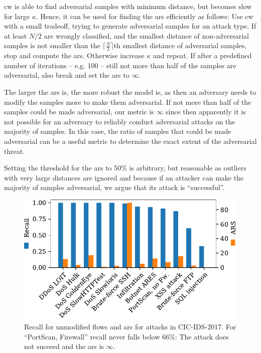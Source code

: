\documentclass[conference]{IEEEtran}
\begin{document}
\gls{cw} is able to find adversarial samples with minimum distance, but becomes slow for large $\kappa$. Hence, it can be used for finding the \gls{ars} efficiently as follows: 
Use \gls{cw} with a small tradeoff, trying to generate adversarial samples for an attack type. If %
 at least $N/2$  are wrongly classified, and
 the smallest distance of non-adversarial samples is not smaller than the $\lceil\frac{N}{2}\rceil$th smallest distance of adversarial samples,
stop and compute the \gls{ars}. Otherwise increase $\kappa$ and repeat. If after a predefined number of iterations -- e.g. 100 -- still not more than half of the samples are adversarial, also break and set the \gls{ars} to $\infty$.

The larger the \gls{ars} is, the more robust the model is, as then an adversary needs to modify the samples more to make them adversarial. If not more than half of the samples could be made adversarial, our metric is $\infty$ since then apparently it is not possible for an adversary to reliably conduct adversarial attacks on the majority of samples. In this case, the ratio of samples that could be made adversarial can be a useful metric to determine the exact extent of the adversarial threat.

Setting the threshold for the \gls{ars} to 50\% is arbitrary, but
 reasonable as outliers with very large distances are ignored and because if an attacker can make the majority of samples adversarial, we argue that its attack is ``successful''.

\begin{figure}[h]
\includegraphics[width=\columnwidth]{../plots/ars_original.pdf}
\caption{Recall for unmodified flows and \gls{ars} for attacks in CIC-IDS-2017. For ``PortScan, Firewall'' recall never falls below 66\%: The attack does not succeed and the \gls{ars} is $\infty$.}
\label{fig:recall_ars}
\end{figure}
\end{document}
